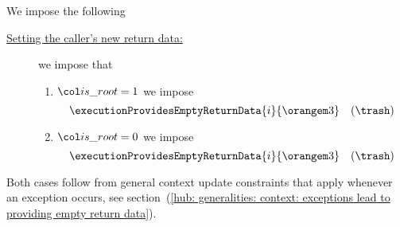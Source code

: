 \begin{center}
\end{center}
We impose the following
\begin{description}
	\item[\underline{Setting the caller's new return data:}]
		we impose that
		\begin{enumerate}
			\item \If $\locIsRoot = 1$ \Then we impose
				\[
					\executionProvidesEmptyReturnData
					{i}{\locCallerContextRowOffsetException}
					\quad (\trash)
				\]
			\item \If $\locIsRoot = 0$ \Then we impose
				\[
					\executionProvidesEmptyReturnData
					{i}{\locCallerContextRowOffsetException}
					\quad (\trash)
				\]
		\end{enumerate}
\end{description}
\saNote{}
Both cases follow from general context update constraints that apply whenever an exception occurs,
see section~(\ref{hub: generalities: context: exceptions lead to providing empty return data}).
